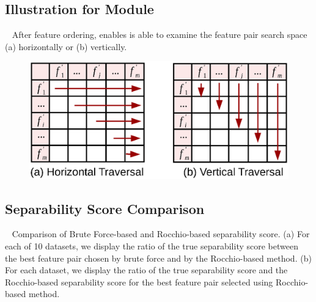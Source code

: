 \subsection{Illustration for \traversal Module}~\label{appF:traversal}
After feature ordering, \traversal enables \genviz is able to examine the feature pair search space (a) horizontally or (b) vertically.
\begin{figure}[!htb]
 \centering
 \includegraphics[width=0.7\linewidth]{fig/traversal.eps}
\label{fig:traversal}
\end{figure}


\subsection{Separability Score Comparison}~\label{appF:exp_sep}
Comparison of Brute Force-based and Rocchio-based separability score. (a) For each of 10 datasets, we display the ratio of the true separability score between the best feature pair chosen by brute force and by the Rocchio-based method. (b) For each dataset, we display the ratio of the true separability score and the Rocchio-based separability score for the best feature pair selected using Rocchio-based method.
\begin{figure}[!htb]
\centering %
\vspace{-5mm}
\label{fig:brute_rocchio}
\end{figure}


